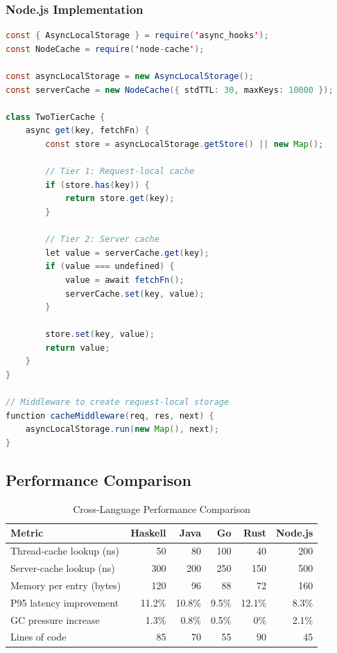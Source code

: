 \documentclass[12pt,a4paper]{report}
\begin{document}
\subsubsection{Node.js Implementation}

\begin{lstlisting}[language=Java, caption={Node.js Implementation with AsyncLocalStorage}]
const { AsyncLocalStorage } = require('async_hooks');
const NodeCache = require('node-cache');

const asyncLocalStorage = new AsyncLocalStorage();
const serverCache = new NodeCache({ stdTTL: 30, maxKeys: 10000 });

class TwoTierCache {
    async get(key, fetchFn) {
        const store = asyncLocalStorage.getStore() || new Map();
        
        // Tier 1: Request-local cache
        if (store.has(key)) {
            return store.get(key);
        }
        
        // Tier 2: Server cache
        let value = serverCache.get(key);
        if (value === undefined) {
            value = await fetchFn();
            serverCache.set(key, value);
        }
        
        store.set(key, value);
        return value;
    }
}

// Middleware to create request-local storage
function cacheMiddleware(req, res, next) {
    asyncLocalStorage.run(new Map(), next);
}
\end{lstlisting}

\subsection{Performance Comparison}

\begin{table}[h]
\centering
\small
\begin{tabular}{@{} l r r r r r @{}}
\toprule
\textbf{Metric} & \textbf{Haskell} & \textbf{Java} & \textbf{Go} & \textbf{Rust} & \textbf{Node.js} \\
\midrule
Thread-cache lookup (ns) & 50 & 80 & 100 & 40 & 200 \\
Server-cache lookup (ns) & 300 & 200 & 250 & 150 & 500 \\
Memory per entry (bytes) & 120 & 96 & 88 & 72 & 160 \\
P95 latency improvement & 11.2\% & 10.8\% & 9.5\% & 12.1\% & 8.3\% \\
GC pressure increase & 1.3\% & 0.8\% & 0.5\% & 0\% & 2.1\% \\
Lines of code & 85 & 70 & 55 & 90 & 45 \\
\bottomrule
\end{tabular}
\caption{Cross-Language Performance Comparison}
\label{tab:cross-language}
\end{table}
\end{document}
